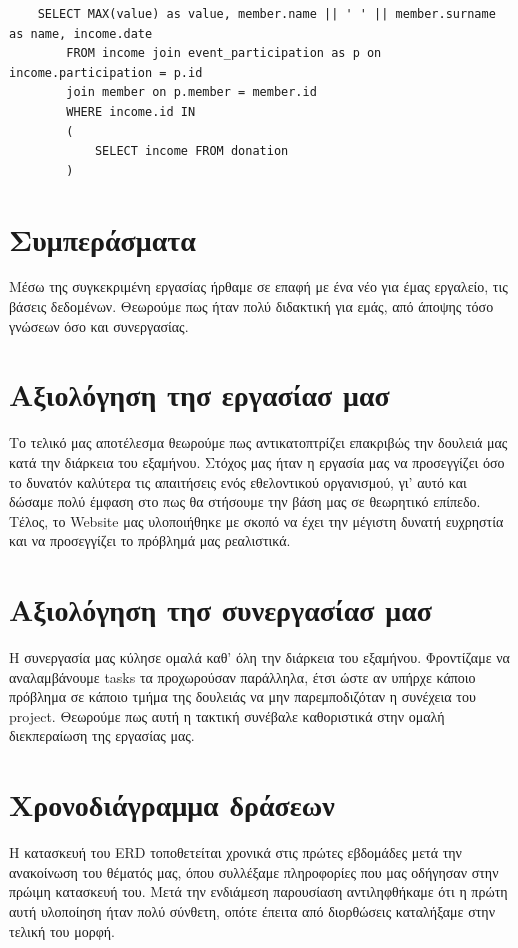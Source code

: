 \documentclass[manuscript,screen,review]{acmart}
\newcommand{\en}[1]{\foreignlanguage{english}{#1}}
\begin{document}
    \begin{lstlisting}
    SELECT MAX(value) as value, member.name || ' ' || member.surname as name, income.date 
        FROM income join event_participation as p on income.participation = p.id
        join member on p.member = member.id
        WHERE income.id IN 
        (
            SELECT income FROM donation
        )
    \end{lstlisting}

\section{Συμπεράσματα}
Μέσω της συγκεκριμένη εργασίας ήρθαμε σε επαφή με ένα νέο για έμας εργαλείο, τις βάσεις δεδομένων. Θεωρούμε πως ήταν πολύ διδακτική για εμάς, από άποψης τόσο γνώσεων όσο και συνεργασίας.  

\section{Αξιολόγηση τησ εργασίασ μασ}
Το τελικό μας αποτέλεσμα θεωρούμε πως αντικατοπτρίζει επακριβώς την δουλειά μας κατά την διάρκεια του εξαμήνου. Στόχος μας ήταν η εργασία μας να προσεγγίζει όσο το δυνατόν καλύτερα τις απαιτήσεις ενός εθελοντικού οργανισμού, γι' αυτό και δώσαμε πολύ έμφαση στο πως θα στήσουμε την βάση μας σε θεωρητικό επίπεδο. Τέλος, το \en{Website} μας υλοποιήθηκε με σκοπό να έχει την μέγιστη δυνατή ευχρηστία και να προσεγγίζει το πρόβλημά μας ρεαλιστικά. 

\section{Αξιολόγηση τησ συνεργασίασ μασ}
Η συνεργασία μας κύλησε ομαλά καθ' όλη την διάρκεια του εξαμήνου. Φροντίζαμε να αναλαμβάνουμε \en{tasks} τα προχωρούσαν παράλληλα, έτσι ώστε αν υπήρχε κάποιο πρόβλημα σε κάποιο τμήμα της δουλειάς να μην παρεμποδιζόταν η συνέχεια του \en{project}. Θεωρούμε πως αυτή η τακτική συνέβαλε καθοριστικά στην ομαλή διεκπεραίωση της εργασίας μας.

\section{Χρονοδιάγραμμα δράσεων}

Η κατασκευή του \en{ERD} τοποθετείται χρονικά στις πρώτες εβδομάδες μετά την ανακοίνωση του θέματός μας, όπου συλλέξαμε πληροφορίες που μας οδήγησαν στην πρώιμη κατασκευή του. Μετά την ενδιάμεση παρουσίαση αντιληφθήκαμε ότι η πρώτη αυτή υλοποίηση ήταν πολύ σύνθετη, οπότε έπειτα από διορθώσεις καταλήξαμε στην τελική του μορφή.
\end{document}
